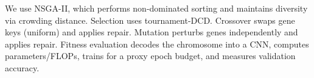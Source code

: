 We use NSGA-II, which performs non-dominated sorting and maintains diversity via crowding distance.
Selection uses tournament-DCD. Crossover swaps gene keys (uniform) and applies repair.
Mutation perturbs genes independently and applies repair. Fitness evaluation decodes the chromosome into a CNN,
computes parameters/FLOPs, trains for a proxy epoch budget, and measures validation accuracy.
